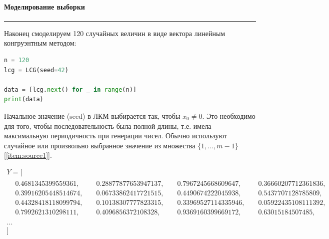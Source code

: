 \documentclass[a4paper, 14pt]{extarticle}
\begin{document}
\paragraph{Моделирование выборки}\vspace{-20pt}\rule{\linewidth}{0.1mm}

Наконец смоделируем 120 случайных величин в виде вектора линейным конгруэнтным методом:\\
\begin{lstlisting}[language=Python]
n = 120
lcg = LCG(seed=42)

data = [lcg.next() for _ in range(n)]
print(data)
\end{lstlisting}
\vspace{10pt}
Начальное значение (seed) в ЛКМ выбирается так, чтобы $x_0 \neq 0$. Это необходимо для того, чтобы 
последовательность была полной длины, т.е. имела максимальную периодичность 
при генерации чисел. Обычно используют случайное или произвольно выбранное 
значение из множества $\{1, ..., m - 1\}$ [\ref{item:source1}]. 

\noindent
\begin{adjustbox}{max width=1\textwidth}
  \parbox{\linewidth}{%
    \begin{gather*}
      Y = [ \\
      \begin{aligned}
        & 0.4681345399559361,  & \hspace{3pt} & 0.28877877653947137, & \hspace{3pt} & 0.7967245668609647,  & \hspace{3pt} & 0.36660207712361836, & \\
        & 0.39916205448514674, & \hspace{3pt} & 0.06733862417721515, & \hspace{3pt} & 0.4490674222045938,  & \hspace{3pt} & 0.5437707128785809,  & \\
        & 0.44328418118099794, & \hspace{3pt} & 0.10138307777823315, & \hspace{3pt} & 0.33969527114335946, & \hspace{3pt} & 0.05922435108111392, & \\
        & 0.7992621310298111,  & \hspace{3pt} & 0.4096856372108328,  & \hspace{3pt} & 0.9369160399669172,  & \hspace{3pt} & 0.63015184507485,    & \\  
      \end{aligned} \\
      ...\\
      ]
    \end{gather*}
  }
\end{adjustbox}
\end{document}
